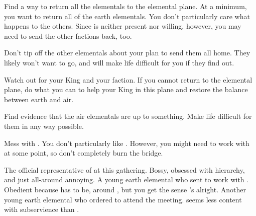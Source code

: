 \documentclass[char]{elementals}
\begin{document}
\begin{itemz}[Goals]
\item Find a way to return all the elementals to the elemental plane.  At a minimum, you want to return all of the earth elementals.  You don't particularly care what happens to the others.  Since \cEarthKing{} is neither present nor willing, however, you may need to send the other factions back, too.
   \item Don't tip off the other elementals about your plan to send them all home.  They likely won't want to go, and will make life difficult for you if they find out.
   \item Watch out for your King and your faction.  If you cannot return to the elemental plane, do what you can to help your King in this plane and restore the balance between earth and air.
	\item Find evidence that the air elementals are up to something.  Make life difficult for them in any way possible.
	\item Mess with \cLoyal{}.  You don't particularly like \cLoyal{\them}.  However, you might need to work with \cLoyal{\them} at some point, so don't completely burn the bridge.
\end{itemz}

\begin{contacts}
	\contact{\cLoyal{}}  The official representative of \cEarthKing{} at this gathering.  Bossy, obsessed with hierarchy, and just all-around annoying.
	\contact{\cMinion{}}  A young earth elemental who \cEarthKing{} sent to work with \cLoyal{}.  Obedient because \cMinion{\they} has to be, around \cLoyal{}, but you get the sense \cMinion{\they}'s  alright.
  \contact{\cMiniEarth{}}  Another young earth elemental who \cLoyal{} ordered to attend the meeting.  \cMiniEarth{\They} seems less content with subservience than \cMinion{}.
\end{contacts}
\end{document}
